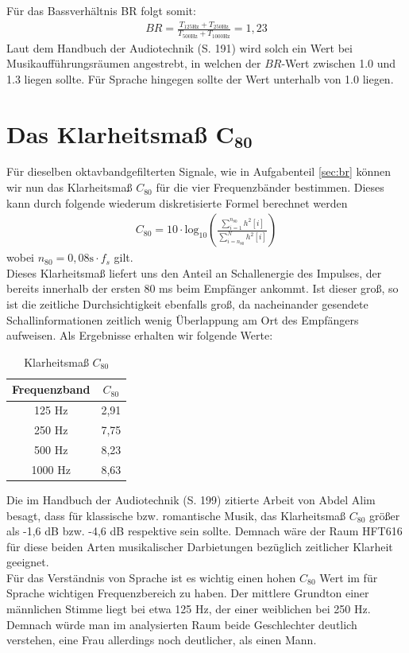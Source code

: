 Für das Bassverhältnis BR folgt somit:
\begin{align*}
BR = \frac{T_{125 \mathrm{Hz}} + T_{250 \mathrm{Hz}}}{T_{500 \mathrm{Hz}} + T_{1000 \mathrm{Hz}}} = 1,23
\end{align*}  
Laut dem Handbuch der Audiotechnik \cite{Weinzierl08} (S. 191) wird solch ein Wert bei Musikaufführungsräumen angestrebt, in welchen der $BR$-Wert zwischen 1.0 und 1.3 liegen sollte.
Für Sprache hingegen sollte der Wert unterhalb von 1.0 liegen.

\section{Das Klarheitsmaß $\mathbf{C_{80}}$}
\label{sec:c80}
Für dieselben oktavbandgefilterten Signale, wie in Aufgabenteil \ref{sec:br} können wir nun das Klarheitsmaß $C_{80}$ für die vier Frequenzbänder bestimmen.
Dieses kann durch folgende wiederum diskretisierte Formel berechnet werden
\begin{align*}
C_{80} = 10\cdot \mathrm{log}_{10}\left(\frac{ \sum_{i=1}^{n_{80}} h^2[i]}{\sum_{i=n_{80}}^N h^2[i]}\right)
\end{align*}
wobei $n_{80} = 0,08 \mathrm{s} \cdot f_s$ gilt. \\
Dieses Klarheitsmaß liefert uns den Anteil an Schallenergie des Impulses, der bereits innerhalb der ersten 80 ms beim Empfänger ankommt.
Ist dieser groß, so ist die zeitliche Durchsichtigkeit ebenfalls groß, da nacheinander gesendete Schallinformationen zeitlich wenig Überlappung am Ort des Empfängers aufweisen.
Als Ergebnisse erhalten wir folgende Werte:
\begin{table}[H]
\centering
\caption{Klarheitsmaß $C_{80}$}
\label{tab:C80}
\begin{tabular}{| c | c |}
\hline
  Frequenzband & $C_{80}$ \\
  \hline
  125 Hz & 2,91 \\
  250 Hz & 7,75 \\
  500 Hz & 8,23 \\
  1000 Hz & 8,63  \\
  \hline
  \end{tabular}
\end{table}

Die im Handbuch der Audiotechnik \cite{Weinzierl08} (S. 199) zitierte Arbeit von Abdel Alim besagt, dass für klassische bzw. romantische Musik, das Klarheitsmaß $C_{80}$ größer als -1,6 dB bzw. -4,6 dB respektive sein sollte.
Demnach wäre der Raum HFT616 für diese beiden Arten musikalischer Darbietungen bezüglich zeitlicher Klarheit geeignet.
\\
Für das Verständnis von Sprache ist es wichtig einen hohen $C_{80}$ Wert im für Sprache wichtigen Frequenzbereich zu haben.
Der mittlere Grundton einer männlichen Stimme liegt bei etwa 125 Hz, der einer weiblichen bei 250 Hz.
Demnach würde man im analysierten Raum beide Geschlechter deutlich verstehen, eine Frau allerdings noch deutlicher, als einen Mann.

